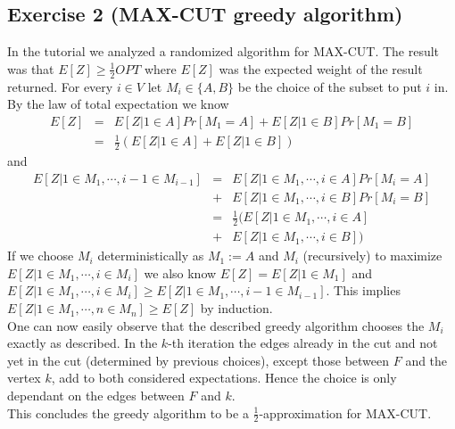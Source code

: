 \subsection*{Exercise 2 \mdseries (MAX-CUT greedy algorithm)}

In the tutorial we analyzed a randomized algorithm for MAX-CUT. The result was that $E[Z] \geq \frac{1}{2}OPT$ where $E[Z]$ was the expected weight of the result returned.
For every $i \in V$ let $M_i \in \{A,B\}$ be the choice of the subset to put $i$ in. By the law of total expectation we know
$$
\begin{array}{rcl}
E[Z] & = & E[Z | 1 \in A]Pr[M_1 = A] + E[Z | 1 \in B]Pr[M_1 = B] \\
& = & \frac{1}{2}(E[Z | 1 \in A] + E[Z | 1 \in B])
\end{array}
$$
and
$$
\begin{array}{rcl}
E[Z | 1 \in M_1, \cdots, i - 1 \in M_{i-1}] & = & E[Z | 1 \in M_1, \cdots, i \in A]Pr[M_i = A] \\
& + & E[Z | 1 \in M_1, \cdots, i \in B]Pr[M_i = B] \\
& = & \frac{1}{2}(E[Z | 1 \in M_1, \cdots, i \in A] \\
& + & E[Z | 1 \in M_1, \cdots, i \in B])
\end{array}
$$
If we choose $M_i$ deterministically as $M_1 := A$ and $M_i$ (recursively) to maximize $E[Z | 1 \in M_1, \cdots, i \in M_{i}]$ we also know $E[Z] = E[Z | 1 \in M_1]$ and $E[Z | 1 \in M_1, \cdots, i \in M_{i}] \geq E[Z | 1 \in M_1, \cdots, i - 1 \in M_{i-1}]$. This implies $E[Z | 1 \in M_1, \cdots, n \in M_{n}] \geq E[Z]$ by induction.\\
One can now easily observe that the described greedy algorithm chooses the $M_i$ exactly as described. In the $k$-th iteration the edges already in the cut and not yet in the cut (determined by previous choices), except those between $F$ and the vertex $k$, add to both considered expectations. Hence the choice is only dependant on the edges between $F$ and $k$.\\
This concludes the greedy algorithm to be a $\frac{1}{2}$-approximation for MAX-CUT.